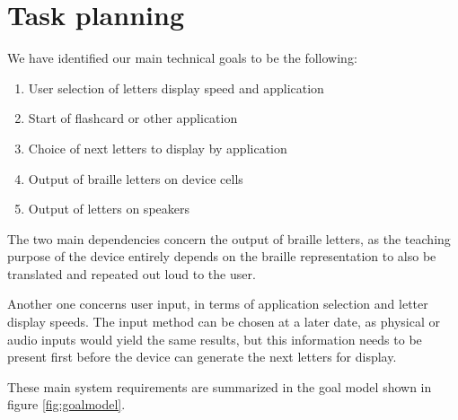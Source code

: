 \documentclass{article}
\begin{document}
\section{Task planning}

We have identified our main technical goals to be the following: 
\begin{enumerate}
  \item User selection of letters display speed and application
  \item Start of flashcard or other application
  \item Choice of next letters to display by application 
  \item Output of braille letters on device cells 
  \item Output of letters on speakers 
\end{enumerate}

The two main dependencies concern the output of braille letters, as the teaching purpose of the device entirely depends on the braille representation to also be translated and repeated out loud to the user. 
 
Another one concerns user input, in terms of application selection and letter display speeds. The input method can be chosen at a later date, as physical or audio inputs would yield the same results, but this information needs to be present first before the device can generate the next letters for display. 
 
These main system requirements are summarized in the goal model shown in figure \ref{fig:goalmodel}.
\end{document}
